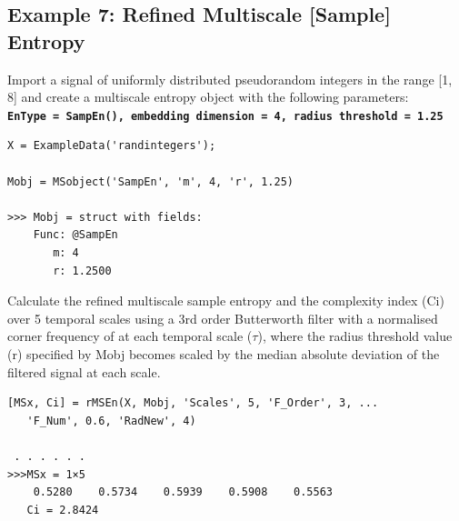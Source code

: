 \documentclass[12pt, a4paper, titlepage, openany]{book}
\begin{document}
\newpage
\subsection{\normalsize Example 7: \hspace{15mm} Refined Multiscale [Sample] Entropy}
\noindent Import a signal of uniformly distributed pseudorandom integers in the range [1, 8] and create a multiscale entropy object with the following parameters:\\
\textbf{\texttt{EnType =  SampEn(), embedding dimension = 4, radius threshold = 1.25}}
\begin{verbatim}
X = ExampleData('randintegers');

Mobj = MSobject('SampEn', 'm', 4, 'r', 1.25)

>>> Mobj = struct with fields:
    Func: @SampEn
       m: 4
       r: 1.2500
\end{verbatim}      
Calculate the refined multiscale sample entropy and the complexity index (Ci) over 5 temporal scales using a 3rd order Butterworth filter with a normalised corner frequency of  at each temporal scale ($\tau$), where the radius threshold value (r) specified by Mobj becomes scaled by the median absolute deviation of the filtered signal at each scale.
\begin{verbatim}
[MSx, Ci] = rMSEn(X, Mobj, 'Scales', 5, 'F_Order', 3, ...
   'F_Num', 0.6, 'RadNew', 4)

 . . . . . .
>>>MSx = 1×5
    0.5280    0.5734    0.5939    0.5908    0.5563
   Ci = 2.8424
\end{verbatim}



\newpage
\end{document}
